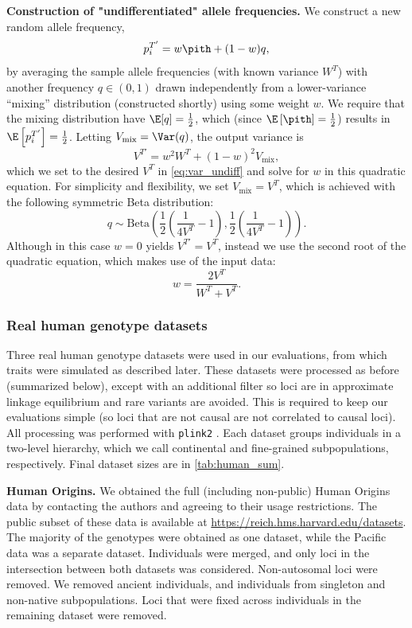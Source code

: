 \documentclass[11pt]{article}
\begin{document}
\textbf{Construction of "undifferentiated" allele frequencies.}
We construct a new random allele frequency,
$$
p_i^{T'} = w \pith + ( 1 - w ) q,
$$
by averaging the sample allele frequencies \pith (with known variance $W^T$) with another frequency $q \in (0, 1)$ drawn independently from a lower-variance ``mixing'' distribution (constructed shortly) using some weight $w$.
We require that the mixing distribution have $\E[q] = \frac{1}{2}$, which (since $\E \left[ \pith \right]  = \frac{1}{2}$) results in $\E \left[ p_i^{T'} \right] = \frac{1}{2}$.
Letting $V_\text{mix} = \Var(q)$, the output variance is
$$
V^{T'}
=
w^2 W^T + (1-w)^2 V_\text{mix}
,
$$
which we set to the desired $V^T$ in \cref{eq:var_undiff} and solve for $w$ in this quadratic equation.
For simplicity and flexibility, we set $V_\text{mix} = V^T$, which is achieved with the following symmetric Beta distribution:
$$
q \sim \text{Beta} \left( \frac{1}{2} \left( \frac{1}{ 4 V^T } - 1 \right), \frac{1}{2} \left( \frac{1}{ 4 V^T } - 1 \right) \right)
.
$$
Although in this case $w=0$ yields $V^{T'} = V^T$, instead we use the second root of the quadratic equation, which makes use of the input \pith data:
$$
w = \frac{ 2 V^T }{ W^T + V^T }.
$$


\subsubsection{Real human genotype datasets}

Three real human genotype datasets were used in our evaluations, from which traits were simulated as described later.
These datasets were processed as before \citep{ochoa_human} (summarized below), except with an additional filter so loci are in approximate linkage equilibrium and rare variants are avoided.
This is required to keep our evaluations simple (so loci that are not causal are not correlated to causal loci).
All processing was performed with \texttt{plink2} \citep{chang_second-generation_2015}.
Each dataset groups individuals in a two-level hierarchy, which we call continental and fine-grained subpopulations, respectively.
Final dataset sizes are in \cref{tab:human_sum}.

\textbf{Human Origins.}
We obtained the full (including non-public) Human Origins data by contacting the authors and agreeing to their usage restrictions.
The public subset of these data is available at \url{https://reich.hms.harvard.edu/datasets}.
The majority of the genotypes \citep{lazaridis_ancient_2014,lazaridis_genomic_2016} were obtained as one dataset, while the Pacific data \citep{skoglund_genomic_2016} was a separate dataset.
Individuals were merged, and only loci in the intersection between both datasets was considered.
Non-autosomal loci were removed.
We removed ancient individuals, and individuals from singleton and non-native subpopulations.
Loci that were fixed across individuals in the remaining dataset were removed.
\end{document}
